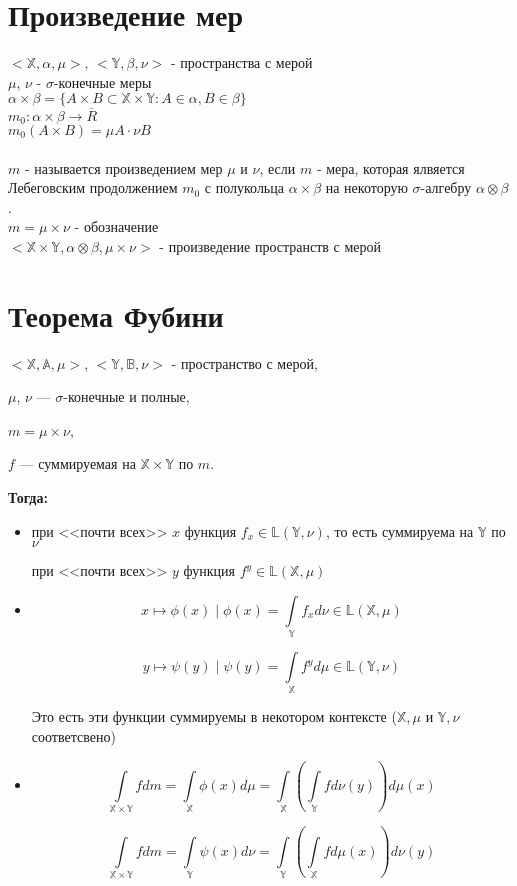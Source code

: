 \documentclass[paper=a4, fontsize=17pt]{article}
\begin{document}
	\section{Произведение мер}
	$<\mathds{X}, \alpha, \mu>$, $<\mathds{Y}, \beta, \nu>$ - пространства с мерой\\
	$\mu$, $\nu$ - $\sigma$-конечные меры\\
	$\alpha \times \beta = \{A\times B \subset \mathds{X} \times \mathds{Y} : A \in \alpha, B \in \beta \}$ \\
	$m_0 : \alpha \times \beta \rightarrow \overline R$\\ $m_0(A \times B) = \mu A \cdot \nu B$ \\\\
	$m$ - называется произведением мер $\mu$ и $\nu$, если $m$ - мера, которая ялвяется Лебеговским продолжением $m_0$ с полукольца $\alpha \times \beta$ на некоторую $\sigma$-алгебру $\alpha \otimes \beta$.\\
	$m = \mu \times \nu$ - обозначение \\
	$<\mathds{X} \times \mathds{Y}, \alpha \otimes \beta, \mu \times \nu>$ - произведение пространств с мерой
	
	\section{Теорема Фубини}
	$<\mathds{X}, \mathds{A}, \mu>$, $<\mathds{Y}, \mathds{B}, \nu>$ - пространство с мерой,
	
	$\mu$, $\nu$ --- $\sigma$-конечные и полные,
	
	$m = \mu \times \nu$,
	
	$f$ --- суммируемая на $\mathds{X} \times \mathds{Y}$ по $m$.
	
	\textbf{Тогда:}
	\begin{itemize}
		\item
		при <<почти всех>> $x$ функция $f_x \in \mathds{L}(\mathds{Y},\nu)$, то есть суммируема на $\mathds{Y}$ по $\nu$
		
		при <<почти всех>> $y$ функция $f^y \in \mathds{L}(\mathds{X},\mu)$
		
		\item
		$$x \mapsto \phi(x) \mid \phi(x) = \int\limits_{\mathds{Y}}f_x d\nu \in \mathds{L}(\mathds{X},\mu)$$
		
		$$y \mapsto \psi(y) \mid \psi(y) = \int\limits_{\mathds{X}}f^y d\mu \in \mathds{L}(\mathds{Y},\nu)$$
		
		Это есть эти функции суммируемы в некотором контексте ($\mathds{X},\mu$ и $\mathds{Y},\nu$ соответсвено)
		
		\item
		$$\int\limits_{\mathds{X} \times \mathds{Y}} f dm
		= \int\limits_{\mathds{X}}\phi(x) d\mu
		= \int\limits_{\mathds{X}} (\int\limits_{\mathds{Y}} f d\nu(y)) d\mu(x)$$
		
		$$\int\limits_{\mathds{X} \times \mathds{Y}} f dm
		= \int\limits_{\mathds{Y}}\psi(x) d\nu
		= \int\limits_{\mathds{Y}} (\int\limits_{\mathds{X}} f d\mu(x)) d\nu(y)$$
	\end{itemize}
	
\end{document}
